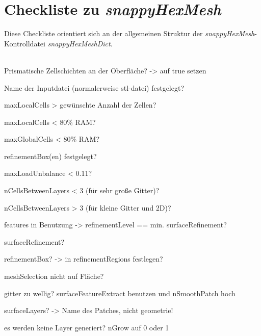 \chapter{Checkliste zu \textit{snappyHexMesh}}

Diese Checkliste orientiert sich an der allgemeinen Struktur der \textit{snappyHexMesh}-Kontrolldatei \textit{snappyHexMeshDict}.
\\
\\
\begin{Form}

\Square{} Prismatische Zellschichten an der Oberfläche? -> auf true setzen

\Square{} Name der Inputdatei (normalerweise stl-datei) festgelegt?

\Square{} maxLocalCells > gewünschte Anzahl der Zellen?

\Square{}  maxLocalCells < 80\% RAM?

\Square{} maxGlobalCells < 80\% RAM?

\Square{} refinementBox(en) festgelegt?

\Square{} maxLoadUnbalance < 0.11?

\Square{} nCellsBetweenLayers < 3 (für sehr große Gitter)?

\Square{} nCellsBetweenLayers > 3 (für kleine Gitter und 2D)?

\Square{} features in Benutzung -> refinementLevel == min. surfaceRefinement?

\Square{} surfaceRefinement?

\Square{} refinementBox? -> in refinementRegions festlegen?

\Square{} meshSelection nicht auf Fläche?

\Square{} gitter zu wellig? surfaceFeatureExtract benutzen und nSmoothPatch hoch

\Square{} surfaceLayers? -> Name des Patches, nicht geometrie!

\Square{} es werden keine Layer generiert? nGrow auf 0 oder 1

\end{Form}

\newpage
